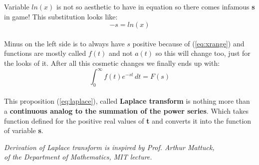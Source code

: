 \documentclass{article}
\begin{document}
\newpage

Variable $ln(x)$ is not so aesthetic to have in equation so there comes infamous \textbf{s} in game! This substitution looks like:\\
\begin{equation}
    -s = ln(x)
\end{equation}\\

\noindent Minus on the left side is to always have \textbf{$s$} positive because of (\ref{eq:xrange}) and functions are mostly called $f(t)$ and not $a(t)$ so this will change too, just for the looks of it. After all this cosmetic changes we finally ends up with:\\

\begin{equation}
\label{eq:laplace}
    \int_0^{\infty} f(t)e^{-st} \, dt = F(s)
\end{equation}\\

\noindent This proposition (\ref{eq:laplace}), called \textbf{Laplace transform} is nothing more than a \textbf{continuous analog to the summation of the power series}. Which takes function defined for the positive real values of \textbf{t} and converts it into the function of variable \textbf{s}. 

\vfill 
\begin{center}
\textit{Derivation of Laplace transform is inspired by Prof. Arthur Mattuck,\\ 
of the Department of Mathematics, MIT lecture.}
\end{center}

 
\end{document}
